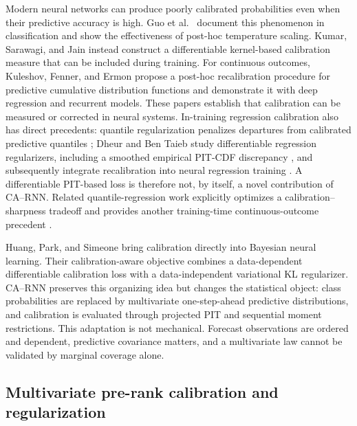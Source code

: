 \documentclass[11pt]{article}
\begin{document}
Modern neural networks can produce poorly calibrated probabilities even when
their predictive accuracy is high.  Guo et al.\ \cite{guo2017calibration}
document this phenomenon in classification and show the effectiveness of
post-hoc temperature scaling.  Kumar, Sarawagi, and Jain
\cite{kumar2018trainable} instead construct a differentiable kernel-based
calibration measure that can be included during training.  For continuous
outcomes, Kuleshov, Fenner, and Ermon \cite{kuleshov2018regression} propose a
post-hoc recalibration procedure for predictive cumulative distribution
functions and demonstrate it with deep regression and recurrent models.  These
papers establish that calibration can be measured or corrected in neural
systems. In-training regression calibration also has direct precedents:
quantile regularization penalizes departures from calibrated predictive
quantiles \cite{utpala2020quantile}; Dheur and Ben Taieb study differentiable
regression regularizers, including a smoothed empirical PIT-CDF discrepancy
\cite{dheur2023large}, and subsequently integrate recalibration into neural
regression training \cite{dheur2024design}. A differentiable PIT-based loss is
therefore not, by itself, a novel contribution of CA--RNN.
Related quantile-regression work explicitly optimizes a calibration--sharpness
tradeoff and provides another training-time continuous-outcome precedent
\cite{chung2021pinball}.

Huang, Park, and Simeone \cite{huang2024cabl} bring calibration directly into
Bayesian neural learning.  Their calibration-aware objective combines a
data-dependent differentiable calibration loss with a data-independent
variational KL regularizer.  CA--RNN preserves this organizing idea but changes
the statistical object: class probabilities are replaced by multivariate
one-step-ahead predictive distributions, and calibration is evaluated through
projected PIT and sequential moment restrictions.  This adaptation is not
mechanical.  Forecast observations are ordered and dependent, predictive
covariance matters, and a multivariate law cannot be validated by marginal
coverage alone.

\subsection{Multivariate pre-rank calibration and regularization}
\end{document}
